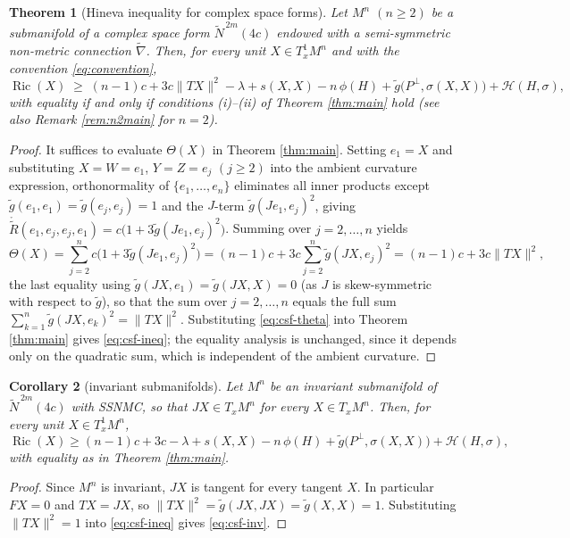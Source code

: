 \documentclass[11pt]{article}
\newtheorem{theorem}{Theorem}[section]
\newtheorem{corollary}[theorem]{Corollary}
\theoremstyle{definition}
\newcommand{\tN}{\widetilde{N}}
\newcommand{\tg}{\widetilde{g}}
\newcommand{\tnabla}{\widetilde{\nabla}}
\newcommand{\ctR}{\mathring{\widetilde{R}}}
\newcommand{\Ric}{\operatorname{Ric}}
\newcommand{\HH}{\mathcal{H}}
\begin{document}
\begin{theorem}[Hineva inequality for complex space forms]\label{thm:csf}
Let $M^n$ $(n\ge2)$ be a submanifold of a complex space form $\tN^{\,2m}(4c)$ endowed with a semi-symmetric non-metric connection $\tnabla$. Then, for every unit $X\in T^1_xM^n$ and with the convention \eqref{eq:convention},
\begin{equation}\label{eq:csf-ineq}
\Ric(X)\;\ge\;(n-1)c+3c\|TX\|^2-\lambda+s(X,X)-n\,\phi(H)+\tg\bigl(P^\perp,\sigma(X,X)\bigr)+\HH(H,\sigma),
\end{equation}
with equality if and only if conditions (i)--(ii) of Theorem \ref{thm:main} hold (see also Remark \ref{rem:n2main} for $n=2$).
\end{theorem}
\begin{proof}
It suffices to evaluate $\Theta(X)$ in Theorem \ref{thm:main}. Setting $e_1=X$ and substituting $X=W=e_1$, $Y=Z=e_j$ $(j\ge2)$ into the ambient curvature expression, orthonormality of $\{e_1,\dots,e_n\}$ eliminates all inner products except $\tg(e_1,e_1)=\tg(e_j,e_j)=1$ and the $J$-term $\tg(Je_1,e_j)^2$, giving $\ctR(e_1,e_j,e_j,e_1)=c\bigl(1+3\tg(Je_1,e_j)^2\bigr)$. Summing over $j=2,\dots,n$ yields
\begin{equation}\label{eq:csf-theta}
\Theta(X)=\sum_{j=2}^{n}c\bigl(1+3\tg(Je_1,e_j)^2\bigr)=(n-1)c+3c\sum_{j=2}^{n}\tg(JX,e_j)^2=(n-1)c+3c\|TX\|^2,
\end{equation}
the last equality using $\tg(JX,e_1)=\tg(JX,X)=0$ (as $J$ is skew-symmetric with respect to $\tg$), so that the sum over $j=2,\dots,n$ equals the full sum $\sum_{k=1}^{n}\tg(JX,e_k)^2=\|TX\|^2$. Substituting \eqref{eq:csf-theta} into Theorem \ref{thm:main} gives \eqref{eq:csf-ineq}; the equality analysis is unchanged, since it depends only on the quadratic sum, which is independent of the ambient curvature.
\end{proof}

\begin{corollary}[invariant submanifolds]\label{cor:csf-inv}
Let $M^n$ be an invariant submanifold of $\tN^{\,2m}(4c)$ with SSNMC, so that $JX\in T_xM^n$ for every $X\in T_xM^n$. Then, for every unit $X\in T^1_xM^n$,
\begin{equation}\label{eq:csf-inv}
\Ric(X)\ge(n-1)c+3c-\lambda+s(X,X)-n\,\phi(H)+\tg\bigl(P^\perp,\sigma(X,X)\bigr)+\HH(H,\sigma),
\end{equation}
with equality as in Theorem \ref{thm:main}.
\end{corollary}
\begin{proof}
Since $M^n$ is invariant, $JX$ is tangent for every tangent $X$. In particular $FX=0$ and $TX=JX$, so $\|TX\|^2=\tg(JX,JX)=\tg(X,X)=1$. Substituting $\|TX\|^2=1$ into \eqref{eq:csf-ineq} gives \eqref{eq:csf-inv}.
\end{proof}
\end{document}
